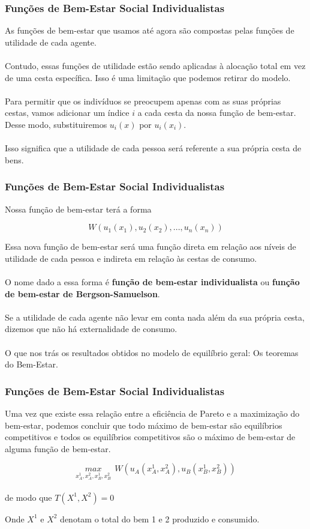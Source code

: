 \documentclass{beamer}[10]
\begin{document}
\begin{frame}
	\frametitle{Funções de Bem-Estar Social Individualistas}

	As funções de bem-estar que usamos até agora são compostas pelas funções de utilidade de cada agente.
	\\~\\
	Contudo, essas funções de utilidade estão sendo aplicadas à alocação total em vez de uma cesta específica. Isso é uma limitação que podemos retirar do modelo.
	\\~\\
	Para permitir que os indivíduos se preocupem apenas com as suas próprias cestas, vamos adicionar um índice $i$ a cada cesta da nossa função de bem-estar. Desse modo, substituiremos $u_i(x)$ por $u_i(x_i)$.
	\\~\\
	Isso significa que a utilidade de cada pessoa será referente a sua própria cesta de bens.

\end{frame}

\begin{frame}
	\frametitle{Funções de Bem-Estar Social Individualistas}

	Nossa função de bem-estar terá a forma

	$$ W(u_1(x_1),u_2(x_2),...,u_n(x_n)) $$
	
	Essa nova função de bem-estar será uma função direta em relação aos níveis de utilidade de cada pessoa e indireta em relação às cestas de consumo.
	\\~\\
	O nome dado a essa forma é \textbf{função de bem-estar individualista} ou \textbf{função de bem-estar de Bergson-Samuelson}.
	\\~\\
	Se a utilidade de cada agente não levar em conta nada além da sua própria cesta, dizemos que não há externalidade de consumo.
	\\~\\
	O que nos trás os resultados obtidos no modelo de equilíbrio geral: Os teoremas do Bem-Estar.

\end{frame}

\begin{frame}
	\frametitle{Funções de Bem-Estar Social Individualistas}

	Uma vez que existe essa relação entre a eficiência de Pareto e a maximização do bem-estar, podemos concluir que todo máximo de bem-estar são equilíbrios competitivos e todos os equilíbrios competitivos são o máximo de bem-estar de alguma função de bem-estar.
	\begin{center}
		$$ \underset{x_A^1,x_A^2,x_B^1,x_B^2}{max} \ \ W(u_A(x_A^1,x_A^2),u_B(x_B^1,x_B^2)) $$
		\\
		\normalsize de modo que $T(X^1,X^2) = 0$
	\end{center}

	Onde $X^1$ e $X^2$ denotam o total do bem 1 e 2 produzido e consumido.

\end{frame}
\end{document}
